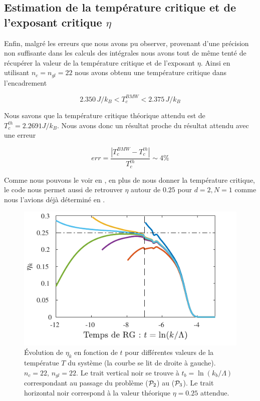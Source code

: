 \documentclass[10.5pt]{article}
\begin{document}
\begin{multicols}{2}
\subsection{Estimation de la température critique et de l'exposant critique $\eta$}

Enfin, malgré les erreurs que nous avons pu observer, provenant d'une précision non suffisante dans les calculs des intégrales nous avons tout de même tenté de récupérer la valeur de la température critique et de l'exposant $\eta$. Ainsi en utilisant $n_c = n_{gl} = 22$ nous avons obtenu une température critique dans l'encadrement

\begin{equation}
2.350 \, J/k_B < T_c^{BMW}  < 2.375 \, J/k_B
\end{equation}

Nous savons que la température critique théorique attendu est de $T_c^{th} = 2.2691 J/k_B$. Nous avons donc un résultat proche du résultat attendu avec une erreur 

\begin{equation}
	err = \frac{ |T_c^{BMW} - T_c^{th}|}{T_c^{th}} \sim 4 \%
\end{equation}


Comme nous pouvons le voir en , en plus de nous donner la température critique, le code nous permet aussi de retrouver $\eta$ autour de $0.25$ pour $d=2, N=1$ comme nous l'avions déjà déterminé en .

\begin{figure}[H]
\begin{center}
	\includegraphics[width=0.95\columnwidth]{MesuRes.pdf}
\end{center}
\caption{Évolution de $\eta_k$ en fonction de $t$ pour différentes valeurs de la températue $T$ du système (la courbe se lit de droite à gauche). $n_c=22$, $n_{gl} = 22$. Le trait vertical noir se trouve à $t_b = \ln(k_b/\Lambda)$ correspondant au passage du problème ($\mathcal{P}_2$) au ($\mathcal{P}_3$). Le trait horizontal noir correspond à la valeur théorique $\eta = 0.25$ attendue. }
\label{fig:etaMesu}
\end{figure}


\end{multicols}
\end{document}

